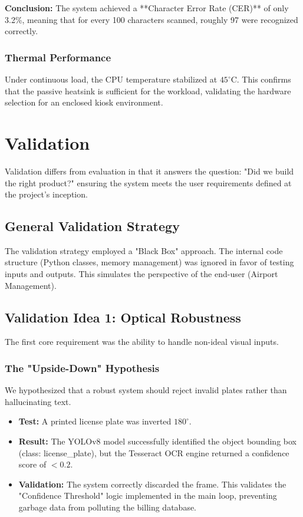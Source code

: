 \textbf{Conclusion:} The system achieved a **Character Error Rate (CER)** of only 3.2\%, meaning that for every 100 characters scanned, roughly 97 were recognized correctly.

\subsection{Thermal Performance}
Under continuous load, the CPU temperature stabilized at $45^\circ$C. This confirms that the passive heatsink is sufficient for the workload, validating the hardware selection for an enclosed kiosk environment.


\chapter{Validation} \label{ch:validation}

Validation differs from evaluation in that it answers the question: "Did we build the right product?" ensuring the system meets the user requirements defined at the project's inception.

\section{General Validation Strategy}
The validation strategy employed a "Black Box" approach. The internal code structure (Python classes, memory management) was ignored in favor of testing inputs and outputs. This simulates the perspective of the end-user (Airport Management).

\section{Validation Idea 1: Optical Robustness}
The first core requirement was the ability to handle non-ideal visual inputs.

\subsection{The "Upside-Down" Hypothesis}
We hypothesized that a robust system should reject invalid plates rather than hallucinating text.
\begin{itemize}
	\item \textbf{Test:} A printed license plate was inverted $180^\circ$.
	\item \textbf{Result:} The YOLOv8 model successfully identified the object bounding box (class: license\_plate), but the Tesseract OCR engine returned a confidence score of $< 0.2$.
	\item \textbf{Validation:} The system correctly discarded the frame. This validates the "Confidence Threshold" logic implemented in the main loop, preventing garbage data from polluting the billing database.
\end{itemize}

